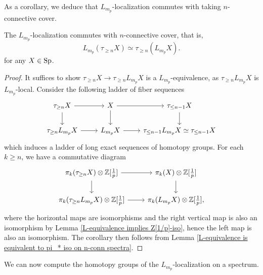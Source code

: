 As a corollary, we deduce that $L_{m_p}$-localization commutes with taking $n$-connective cover.
\begin{corollary}
\label{L-localization commutes with connective cover}
	The $L_{m_p}$-localization commutes with $n$-connective cover, that is, 
	$$
	L_{m_p}(\tau_{\geq n}X)\simeq \tau_{\geq n}(L_{m_p} X).
	$$
	for any $X\in \operatorname{Sp}$.
\end{corollary}
\begin{proof}
	It suffices to show $\tau_{\geq n}X\to \tau_{\geq n}L_{m_{p}}X$ is a $L_{m_p}$-equivalence, as $\tau_{\geq n}L_{m_{p}}X$ is $L_{m_p}$-local. Consider the following ladder of fiber sequences
	\[
	\begin{tikzcd}
		\tau_{\geq n}X & X & \tau_{\leq n-1}X    \\
		\tau_{\geq n}L_{m_p}X & L_{m_p}X & \tau_{\leq n-1} L_{m_p}X\simeq \tau_{\leq n-1}X
		\arrow[from=1-1, to=1-2]
		\arrow[from=2-1, to=2-2]
		\arrow[from=1-3, to=2-3]
		\arrow[from=1-2, to=1-3]
		\arrow[from=2-2, to=2-3]
		\arrow[from=1-1, to=2-1]
		\arrow[from=1-2, to=2-2]
	\end{tikzcd}
	\]
	which induces a ladder of long exact sequences of homotopy groups. For each $k\geq n$, we have a commutative diagram
	\[
	\begin{tikzcd}
		\pi_{k}(\tau_{\geq n}X)\otimes \BZ[\frac{1}{p}] & \pi_{k}(X) \otimes \BZ[\frac{1}{p}] \\
		\pi_{k}(\tau_{\geq n}L_{m_p}X)\otimes \BZ[\frac{1}{p}]  & \pi_{k}(L_{m_p}X)\otimes \BZ[\frac{1}{p}] 
		\arrow[from=1-1, to=1-2]
		\arrow[from=2-1, to=2-2]
		\arrow[from=1-1, to=2-1]
		\arrow[from=1-2, to=2-2],
	\end{tikzcd}
	\]
	where the horizontal maps are isomorphisms and the right vertical map is also an isomorphism by Lemma \ref{L-equivalence implies Z[1/p]-iso}, hence the left map is also an isomorphism.
	The corollary then follows from Lemma \ref{L-equivalence is equivalent to pi_* iso on n-conn spectra}.
\end{proof}


We can now compute the homotopy groups of the $L_{m_p}$-localization on a spectrum.


